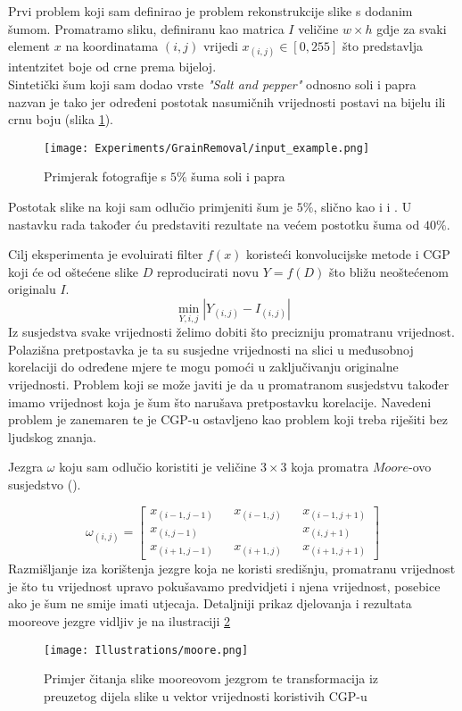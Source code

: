 Prvi problem koji sam definirao je problem rekonstrukcije slike s dodanim šumom.
Promatramo sliku, definiranu kao matrica $I$ veličine $w \times h$ gdje za svaki element $x$ na koordinatama $(i, j)$ vrijedi $x_{(i, j)} \in [0, 255]$ što predstavlja intentzitet boje od crne prema bijeloj. \\
Sintetički šum koji sam dodao vrste \emph{"Salt and pepper"} odnosno soli i papra nazvan je tako jer određeni postotak nasumičnih vrijednosti postavi na bijelu ili crnu boju (slika \ref{fig:salt_pepper_example}).

\begin{figure}
	\centering
	\texttt{[image: Experiments/GrainRemoval/input\_example.png]}
	\caption{Primjerak fotografije s $5\%$ šuma soli i papra}
	\label{fig:salt_pepper_example}
\end{figure}

Postotak slike na koji sam odlučio primjeniti šum je $5\%$, slično kao i \cite{cgp_image_processing} i \cite{Sekanina2011}.
U nastavku rada također ću predstaviti rezultate na većem postotku šuma od $40\%$.

Cilj eksperimenta je evoluirati filter $f(x)$ koristeći konvolucijske metode i CGP koji će od oštećene slike $D$ reproducirati novu $Y = f(D)$ što bližu neoštećenom originalu $I$.
$$
\min_{Y, i, j} |Y_{(i, j)} - I_{(i, j)}|
$$
Iz susjedstva svake vrijednosti želimo dobiti što precizniju promatranu vrijednost. \\
Polazišna pretpostavka je ta su susjedne vrijednosti na slici u međusobnoj korelaciji do određene mjere te mogu pomoći u zaključivanju originalne vrijednosti.
Problem koji se može javiti je da u promatranom susjedstvu također imamo vrijednost koja je šum što narušava pretpostavku korelacije.
Navedeni problem je zanemaren te je CGP-u ostavljeno kao problem koji treba riješiti bez ljudskog znanja.

Jezgra $\omega$ koju sam odlučio koristiti je veličine $3 \times 3$ koja promatra $Moore$-ovo susjedstvo (\cite{jakobovic}).

\[
	\omega_{(i, j)}
	=
	\begin{bmatrix}
		x_{(i - 1, j - 1)} && x_{(i - 1, j)} && x_{(i - 1, j + 1)}\\
		x_{(i, j - 1)} && && x_{(i, j + 1)}\\
		x_{(i + 1, j - 1)} && x_{(i + 1, j)} && x_{(i + 1, j + 1)}
	\end{bmatrix}
\]
Razmišljanje iza korištenja jezgre koja ne koristi središnju, promatranu vrijednost je što tu vrijednost upravo pokušavamo predvidjeti i njena vrijednost, posebice ako je šum ne smije imati utjecaja.
Detaljniji prikaz djelovanja i rezultata mooreove jezgre vidljiv je na ilustraciji \ref{fig:moore_example}

\begin{figure}
	\centering
	\texttt{[image: Illustrations/moore.png]}
	\caption{Primjer čitanja slike mooreovom jezgrom te transformacija iz preuzetog dijela slike u vektor vrijednosti koristivih CGP-u}
	\label{fig:moore_example}
\end{figure}


